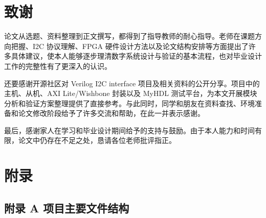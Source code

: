 \section{致谢}\label{ux81f4ux8c22}

论文从选题、资料整理到正文撰写，都得到了指导教师的耐心指导。老师在课题方向把握、I2C
协议理解、FPGA
硬件设计方法以及论文结构安排等方面提出了许多具体建议，使本人能够逐步理清数字系统设计与验证的基本流程，也对毕业设计工作的完整性有了更深入的认识。

还要感谢开源社区对 Verilog I2C interface
项目及相关资料的公开分享。项目中的主机、从机、AXI Lite/Wishbone 封装以及
MyHDL
测试平台，为本文开展模块分析和验证方案整理提供了直接参考。与此同时，同学和朋友在资料查找、环境准备和论文修改阶段给予了许多交流和帮助，在此一并表示感谢。

最后，感谢家人在学习和毕业设计期间给予的支持与鼓励。由于本人能力和时间有限，论文中仍存在不足之处，恳请各位老师批评指正。

\section{附录}\label{ux9644ux5f55}

\subsection{附录 A
项目主要文件结构}\label{ux9644ux5f55-a-ux9879ux76eeux4e3bux8981ux6587ux4ef6ux7ed3ux6784}

\begin{Shaded}
\begin{Highlighting}[]
\end{Highlighting}
\end{Shaded}


